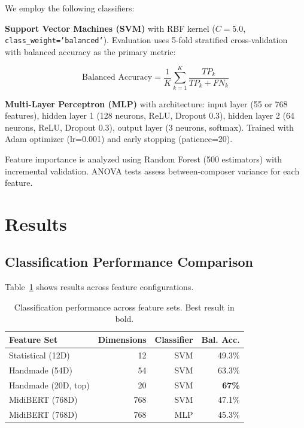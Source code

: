 \documentclass{article}
\begin{document}
We employ the following classifiers:

\textbf{Support Vector Machines (SVM)} with RBF kernel ($C=5.0$, \texttt{class\_weight='balanced'}). Evaluation uses 5-fold stratified cross-validation with balanced accuracy as the primary metric:

\begin{equation}\label{eq:balanced_acc}
\text{Balanced Accuracy} = \frac{1}{K} \sum_{k=1}^{K} \frac{TP_k}{TP_k + FN_k}
\end{equation}

\textbf{Multi-Layer Perceptron (MLP)} with architecture: input layer (55 or 768 features), hidden layer 1 (128 neurons, ReLU, Dropout 0.3), hidden layer 2 (64 neurons, ReLU, Dropout 0.3), output layer (3 neurons, softmax). Trained with Adam optimizer (lr=0.001) and early stopping (patience=20).

Feature importance is analyzed using Random Forest (500 estimators) with incremental validation. ANOVA tests assess between-composer variance for each feature.

\section{Results}\label{sec:results}

\subsection{Classification Performance Comparison}

Table~\ref{tab:performance} shows results across feature configurations.

\begin{table}[h]
\centering
\caption{Classification performance across feature sets. Best result in bold.}
\label{tab:performance}
\begin{tabular}{lrrr}
\toprule
Feature Set & Dimensions & Classifier & Bal. Acc. \\
\midrule
Statistical (12D) & 12 & SVM & 49.3\% \\
Handmade (54D) & 54 & SVM & 63.3\% \\
Handmade (20D, top) & 20 & SVM & \textbf{~67\%} \\
MidiBERT (768D) & 768 & SVM & 47.1\% \\
MidiBERT (768D) & 768 & MLP & 45.3\% \\
\bottomrule
\end{tabular}
\end{table}
\end{document}
